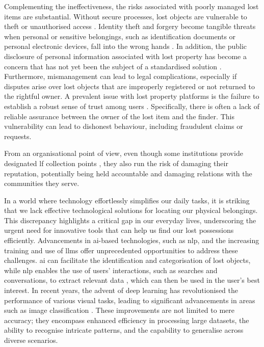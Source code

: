 Complementing the ineffectiveness, the risks associated with poorly managed lost items are substantial. Without secure processes, lost objects are vulnerable to theft or unauthorised access \cite{Tan2023}. Identity theft and forgery become tangible threats when personal or sensitive belongings, such as identification documents or personal electronic devices, fall into the wrong hands \cite{Xue2022}. In addition, the public disclosure of personal information associated with lost property has become a concern that has not yet been the subject of a standardised solution \cite{Xue2022}. Furthermore, mismanagement can lead to legal complications, especially if disputes arise over lost objects that are improperly registered or not returned to the rightful owner. A prevalent issue with lost property platforms is the failure to establish a robust sense of trust among users \cite{Xue2022}. Specifically, there is often a lack of reliable assurance between the owner of the lost item and the finder. This vulnerability can lead to dishonest behaviour, including fraudulent claims or requests.

From an organisational point of view, even though some institutions provide designated \ac{lf} collection points \cite{Tan2023}, they also run the risk of damaging their reputation, potentially being held accountable and damaging relations with the communities they serve.

In a world where technology effortlessly simplifies our daily tasks, it is striking that we lack effective technological solutions for locating our physical belongings. This discrepancy highlights a critical gap in our everyday lives, underscoring the urgent need for innovative tools that can help us find our lost possessions efficiently. Advancements in \ac{ai}-based technologies, such as \ac{nlp}, and the increasing training and use of \acp{llm} offer unprecedented opportunities to address these challenges. \ac{ai} can facilitate the identification and categorisation of lost objects, while \ac{nlp} enables the use of users' interactions, such as searches and conversations, to extract relevant data \cite{Prawira2024}, which can then be used in the user's best interest. In recent years, the advent of deep learning has revolutionised the performance of various visual tasks, leading to significant advancements in areas such as image classification \cite{Liu2022}. These improvements are not limited to mere accuracy; they encompass enhanced efficiency in processing large datasets, the ability to recognise intricate patterns, and the capability to generalise across diverse scenarios. 


